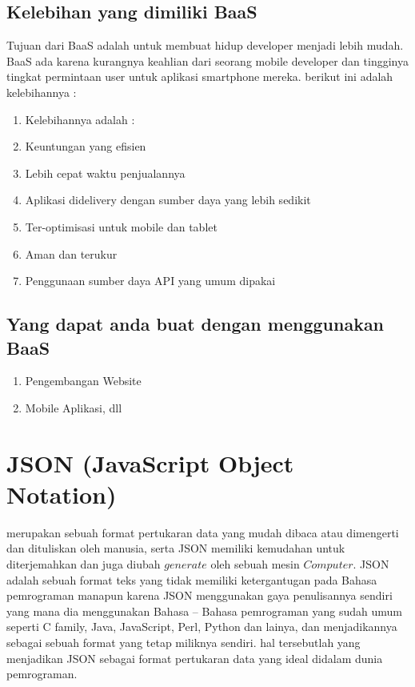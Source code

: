 \subsection{Kelebihan yang dimiliki BaaS}
Tujuan dari BaaS adalah untuk membuat hidup developer menjadi 
lebih mudah. BaaS ada karena kurangnya keahlian dari seorang 
mobile developer dan tingginya tingkat permintaan user untuk 
aplikasi smartphone mereka. berikut ini adalah kelebihannya :

\begin{enumerate}
\item Kelebihannya adalah :
\item Keuntungan yang efisien
\item Lebih cepat waktu penjualannya
\item Aplikasi didelivery dengan sumber daya yang lebih sedikit
\item Ter-optimisasi untuk mobile dan tablet
\item Aman dan terukur
\item Penggunaan sumber daya API yang umum dipakai
\end{enumerate}

\subsection {Yang dapat anda buat dengan menggunakan BaaS}
\begin{enumerate}
\item Pengembangan Website
\item Mobile Aplikasi, dll
\end{enumerate}

\section{JSON (JavaScript Object Notation)}
	merupakan sebuah format pertukaran data yang mudah dibaca atau dimengerti dan dituliskan oleh manusia, 
serta JSON memiliki kemudahan untuk diterjemahkan dan juga diubah \(generate\) oleh sebuah mesin \(Computer\).
JSON adalah sebuah format teks yang tidak memiliki ketergantugan pada Bahasa pemrograman manapun karena JSON menggunakan 
gaya penulisannya sendiri yang mana dia menggunakan Bahasa – Bahasa pemrograman yang sudah umum seperti C family, Java, 
JavaScript, Perl, Python dan lainya, dan menjadikannya sebagai sebuah format yang tetap miliknya sendiri.
hal tersebutlah yang menjadikan JSON sebagai format pertukaran data yang ideal didalam dunia pemrograman. 


